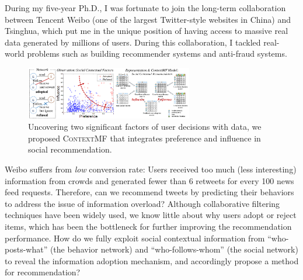 \documentclass[10.5pt]{article}
\begin{document}
\vskip 0.03in
\vskip 0.01in

During my five-year Ph.D., I was fortunate to join the long-term collaboration between Tencent Weibo (one of the largest Twitter-style websites in China) and Tsinghua, which put me in the unique position of having access to massive real data generated by millions of users. During this collaboration, I tackled real-world problems such as building recommender systems and anti-fraud systems.

\vskip 0.03in


\begin{figure}
\vskip -0.12in
\includegraphics[width=0.65\textwidth]{figure/contextmf.pdf}
\vskip -0.18in
\caption{Uncovering two significant factors of user decisions with data, we proposed \textsc{ContextMF} \cite{jiang2012socialcontextual} that integrates preference and influence in social recommendation.}
\label{fig:contextmf}
\vskip -0.12in
\end{figure}

Weibo suffers from \textit{low} conversion rate: Users received too much (less interesting) information from crowds and generated fewer than 6 retweets for every 100 news feed requests. Therefore, can we recommend tweets by predicting their behaviors to address the issue of information overload? Although collaborative filtering techniques have been widely used, we know little about why users adopt or reject items, which has been the bottleneck for further improving the recommendation performance. How do we fully exploit social contextual information from ``who-posts-what'' (the behavior network) and ``who-follows-whom'' (the social network) to reveal the information adoption mechanism, and accordingly propose a method for recommendation?
\end{document}
